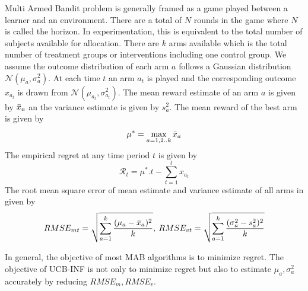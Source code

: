 \documentclass[12pt, letterpaper]{article}
\begin{document}
Multi Armed Bandit problem is generally framed as a game played between a learner and an environment. There are a total of $N$ rounds in the game where $N$ is called the horizon. In experimentation, this is equivalent to the total number of subjects available for allocation. There are $k$ arms available which is the total number of treatment groups or interventions including one control group. We assume the outcome distribution of each arm $a$ follows a Gaussian distribution $\mathcal{N}(\mu_a, \sigma_a^2)$. At each time $t$ an arm $a_t$ is played and the corresponding outcome $x_{a_t}$ is drawn from $\mathcal{N}(\mu_{a_t}, \sigma_{a_t}^2)$. The mean reward estimate of an arm $a$ is given by $\Bar{x}_a$ an the variance estimate is given by $s_a^2$. The mean reward of the best arm is given by 
$$\mu^* = \max_{a=1,2..k}\Bar{x}_a$$ 
The empirical regret at any time period $t$ is given by
$$\mathcal{R}_t = \mu^* . t - \sum_{t=1}^{t} x_{a_t}$$
The root mean square error of mean estimate and variance estimate of all arms in given by 
$$RMSE_{mt} = \sqrt{\sum_{a=1}^{k} \frac{(\mu_a -\Bar{x}_a)^2}{k}}, \: RMSE_{vt} = \sqrt{\sum_{a=1}^{k} \frac{(\sigma_a^2 - s_a^2)^2}{k}}$$


In general, the objective of most MAB algorithms is to minimize regret. The objective of UCB-INF is not only to minimize regret but also to estimate $\mu_{a}, \sigma_{a}^2$ accurately by reducing $RMSE_m, RMSE_v$.
\end{document}
